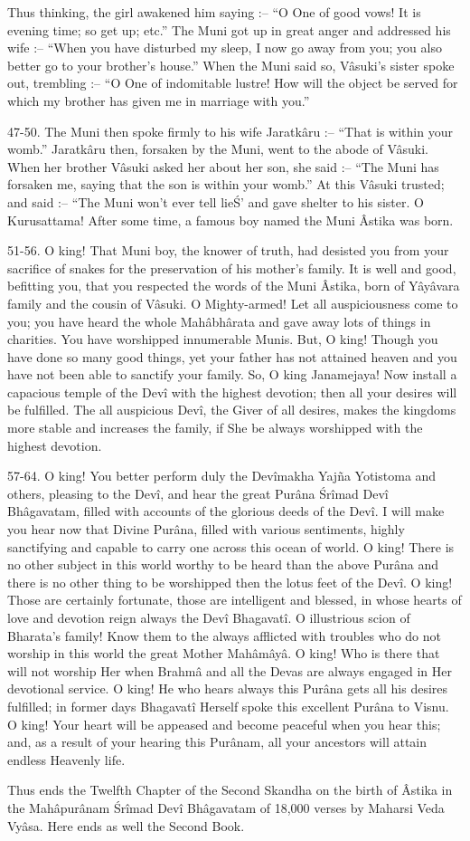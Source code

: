 Thus thinking, the girl awakened him saying :-- ``O One of good vows! It is evening time; so get up; etc.'' The Muni got up in great anger and addressed his wife :-- ``When you have disturbed my sleep, I now go away from you; you also better go to your brother's house.'' When the Muni said so, V\^asuki's sister spoke out, trembling :-- ``O One of indomitable lustre! How will the object be served for which my brother has given me in marriage with you.''

47-50. The Muni then spoke firmly to his wife Jaratk\^aru :-- ``That is within your womb.'' Jaratk\^aru then, forsaken by the Muni, went to the abode of V\^asuki. When her brother V\^asuki asked her about her son, she said :-- ``The Muni has forsaken me, saying that the son is within your womb.'' At this V\^asuki trusted; and said :-- ``The Muni won't ever tell lie\'S' and gave shelter to his sister. O Kurusattama! After some time, a famous boy named the Muni \^Astika was born.

51-56. O king! That Muni boy, the knower of truth, had desisted you from your sacrifice of snakes for the preservation of his mother's family. It is well and good, befitting you, that you respected the words of the Muni \^Astika, born of Y\^ay\^avara family and the cousin of V\^asuki. O Mighty-armed! Let all auspiciousness come to you; you have heard the whole Mah\^abh\^arata and gave away lots of things in charities. You have worshipped innumerable Munis. But, O king! Though you have done so many good things, yet your father has not attained heaven and you have not been able to sanctify your family. So, O king Janamejaya! Now install a capacious temple of the Dev\^i with the highest devotion; then all your desires will be fulfilled. The all auspicious Dev\^i, the Giver of all desires, makes the kingdoms more stable and increases the family, if She be always worshipped with the highest devotion.

57-64. O king! You better perform duly the Dev\^imakha Yaj\~na Yotistoma and others, pleasing to the Dev\^i, and hear the great Pur\^ana \'Sr\^imad Dev\^i Bh\^agavatam, filled with accounts of the glorious deeds of the Dev\^i. I will make you hear now that Divine Pur\^ana, filled with various sentiments, highly sanctifying and capable to carry one across this ocean of world. O king! There is no other subject in this world worthy to be heard than the above Pur\^ana and there is no other thing to be worshipped then the lotus feet of the Dev\^i. O king! Those are certainly fortunate, those are intelligent and blessed, in whose hearts of love and devotion reign always the Dev\^i Bhagavat\^i. O illustrious scion of Bharata's family! Know them to the always afflicted with troubles who do not worship in this world the great Mother Mah\^am\^ay\^a. O king! Who is there that will not worship Her when Brahm\^a and all the Devas are always engaged in Her devotional service. O king! He who hears always this Pur\^ana gets all his desires fulfilled; in former days Bhagavat\^i Herself spoke this excellent Pur\^ana to Visnu. O king! Your heart will be appeased and become peaceful when you hear this; and, as a result of your hearing this Pur\^anam, all your ancestors will attain endless Heavenly life.

Thus ends the Twelfth Chapter of the Second Skandha on the birth of \^Astika in the Mah\^apur\^anam \'Sr\^imad Dev\^i Bh\^agavatam of 18,000 verses by Maharsi Veda Vy\^asa. Here ends as well the Second Book.